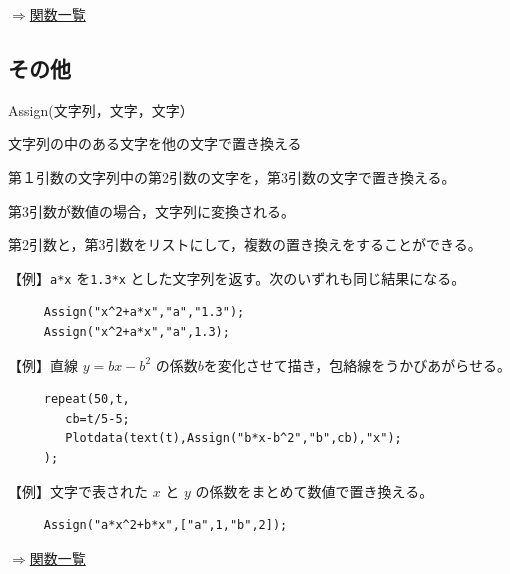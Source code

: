 \documentclass[papersize,a4paper,12pt,uplatex]{jsarticle}
\begin{document}
\begin{flushright}  \hyperlink{functionlist}{$\Rightarrow$関数一覧}\end{flushright}
\newpage

\subsection{その他}
\begin{description}

\hypertarget{assign}{}
\item[関数]  Assign(文字列，文字，文字）
\item[機能]  文字列の中のある文字を他の文字で置き換える
\item[説明]  第１引数の文字列中の第2引数の文字を，第3引数の文字で置き換える。

第3引数が数値の場合，文字列に変換される。

第2引数と，第3引数をリストにして，複数の置き換えをすることができる。

\vspace{\baselineskip}
  【例】\verb|a*x| を\verb|1.3*x| とした文字列を返す。次のいずれも同じ結果になる。
\begin{verbatim}
     Assign("x^2+a*x","a","1.3"); 
     Assign("x^2+a*x","a",1.3);
\end{verbatim}

\vspace{\baselineskip}
  【例】直線 $y=bx-b^2$ の係数$b$を変化させて描き，包絡線をうかびあがらせる。
\begin{verbatim}
     repeat(50,t,
        cb=t/5-5;
        Plotdata(text(t),Assign("b*x-b^2","b",cb),"x");
     );
\end{verbatim}
 \vspace{\baselineskip}
          \begin{center}  \end{center}
\vspace{\baselineskip}
  【例】文字で表された $x$ と $y$ の係数をまとめて数値で置き換える。
\begin{verbatim} 
     Assign("a*x^2+b*x",["a",1,"b",2]);
\end{verbatim}

\vspace{\baselineskip}
\begin{flushright}  \hyperlink{functionlist}{$\Rightarrow$関数一覧}\end{flushright}



\end{description}
\end{document}
